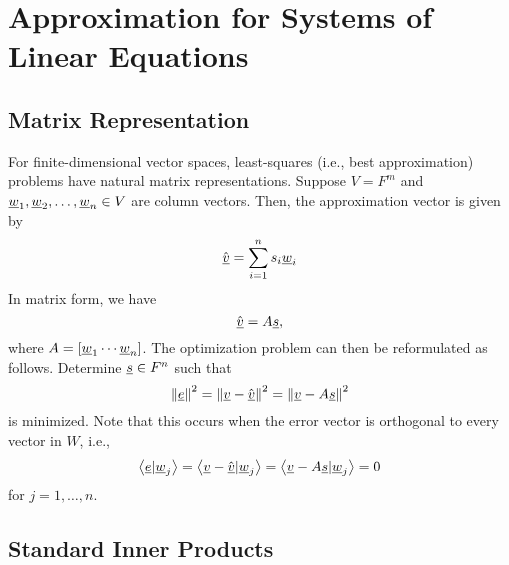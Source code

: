 \section{Approximation for Systems of Linear Equations}

\subsection{Matrix Representation}

For finite-dimensional vector spaces, least-squares (i.e., best approximation) problems have natural matrix representations.
Suppose $V = F^m$ and $\underline{w}_1, \underline{w}_2, \ldots, \underline{w}_n \in V$ are column vectors.
Then, the approximation vector is given by
\begin{equation*}
\hat{\underline{v}} = \sum_{i=1}^n s_i \underline{w}_i
\end{equation*}
In matrix form, we have
\begin{equation*}
\hat{\underline{v}} = A \underline{s},
\end{equation*}
where $A = \left[ \underline{w}_1 \cdots \underline{w}_n \right]$.
The optimization problem can then be reformulated as follows.
Determine $\underline{s} \in F^n$ such that
\begin{equation*}
\left\| \underline{e} \right\|^2
= \left\| \underline{v} - \hat{\underline{v}} \right\|^2
= \left\| \underline{v} - A \underline{s} \right\|^2
\end{equation*}
is minimized.
Note that this occurs when the error vector is orthogonal to every vector in $W$, i.e.,
\begin{equation*}
\left\langle \underline{e} | \underline{w}_j \right\rangle
= \left\langle \underline{v} - \hat{\underline{v}} | \underline{w}_j \right\rangle
= \left\langle \underline{v} - A \underline{s} | \underline{w}_j \right\rangle
= 0
\end{equation*}
for $j = 1, \ldots, n$.


\subsection{Standard Inner Products}

